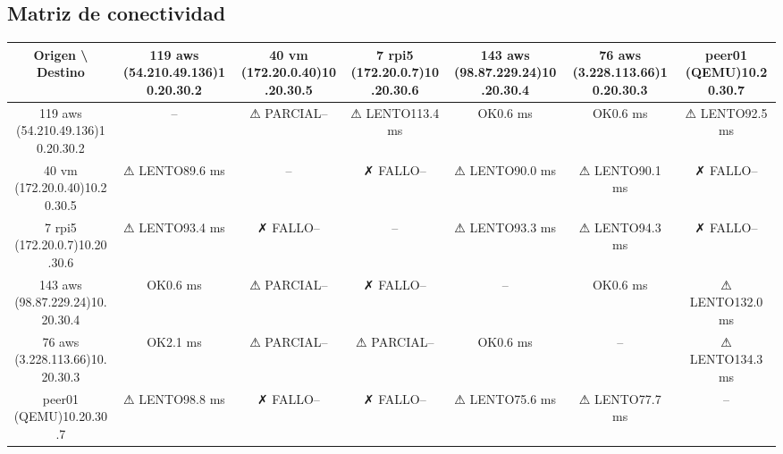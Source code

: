 \documentclass[11pt,a4paper]{article}
\begin{document}
\subsection{Matriz de conectividad}
\begin{longtable}{|c|c|c|c|c|c|c|}
\hline
Origen \textbackslash{} Destino & 119 aws (54.210.49.136)10.20.30.2 & 40 vm (172.20.0.40)10.20.30.5 & 7 rpi5 (172.20.0.7)10.20.30.6 & 143 aws (98.87.229.24)10.20.30.4 & 76 aws (3.228.113.66)10.20.30.3 & peer01 (QEMU)10.20.30.7 \\ \hline
119 aws (54.210.49.136)10.20.30.2 & -- & ⚠ PARCIAL-- & ⚠ LENTO113.4 ms & OK0.6 ms & OK0.6 ms & ⚠ LENTO92.5 ms \\ \hline
40 vm (172.20.0.40)10.20.30.5 & ⚠ LENTO89.6 ms & -- & ✗ FALLO-- & ⚠ LENTO90.0 ms & ⚠ LENTO90.1 ms & ✗ FALLO-- \\ \hline
7 rpi5 (172.20.0.7)10.20.30.6 & ⚠ LENTO93.4 ms & ✗ FALLO-- & -- & ⚠ LENTO93.3 ms & ⚠ LENTO94.3 ms & ✗ FALLO-- \\ \hline
143 aws (98.87.229.24)10.20.30.4 & OK0.6 ms & ⚠ PARCIAL-- & ✗ FALLO-- & -- & OK0.6 ms & ⚠ LENTO132.0 ms \\ \hline
76 aws (3.228.113.66)10.20.30.3 & OK2.1 ms & ⚠ PARCIAL-- & ⚠ PARCIAL-- & OK0.6 ms & -- & ⚠ LENTO134.3 ms \\ \hline
peer01 (QEMU)10.20.30.7 & ⚠ LENTO98.8 ms & ✗ FALLO-- & ✗ FALLO-- & ⚠ LENTO75.6 ms & ⚠ LENTO77.7 ms & -- \\ \hline
\end{longtable}
\end{document}
